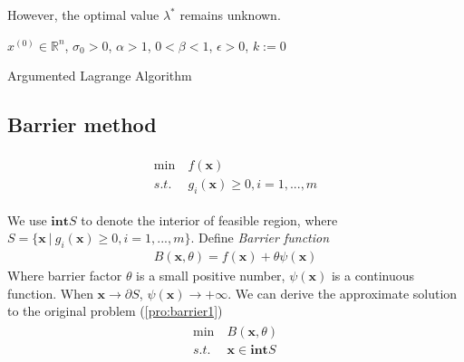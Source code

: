 However, the optimal value $\lambda^*$ remains
unknown.

\begin{algorithm}[H]
    \SetAlgoLined
     $x^{(0)} \in \mathbb{R}^n$, $\sigma_0 > 0$, $\alpha > 1$,
     $0 < \beta < 1$, $\epsilon > 0$, $k:= 0$\;
     \caption{Argumented Lagrange Algorithm}
\end{algorithm}


\subsection{Barrier method}

\begin{align}
    \begin{array}{ll}
        \min \ &f(\mathbf{x}) \\
        s.t. \ &g_i (\mathbf{x}) \geq 0, i = 1,..., m
    \end{array}
    \label{pro:barrier1}
\end{align}

We use $\mathbf{int}S$ to denote the interior
of feasible region, where
$S = \{ \mathbf{x} \ | \ g_i(\mathbf{x}) \geq 0,
i = 1,...,m \}$. Define \emph{Barrier function}
\begin{align}
    B(\mathbf{x}, \theta) = f(\mathbf{x}) + 
    \theta \psi (\mathbf{x})
\end{align}
Where barrier factor $\theta$ is a small positive number,
$\psi(\mathbf{x})$ is a continuous function.
When $\mathbf{x} \rightarrow \partial S$,
$\psi(\mathbf{x}) \rightarrow + \infty$.
We can derive the approximate solution to
the original problem (\ref{pro:barrier1})
\begin{align}
    \begin{array}{ll}
        \min \ &B(\mathbf{x}, \theta) \\
        s.t. \ &\mathbf{x} \in \mathbf{int}S
    \end{array}
\end{align}

